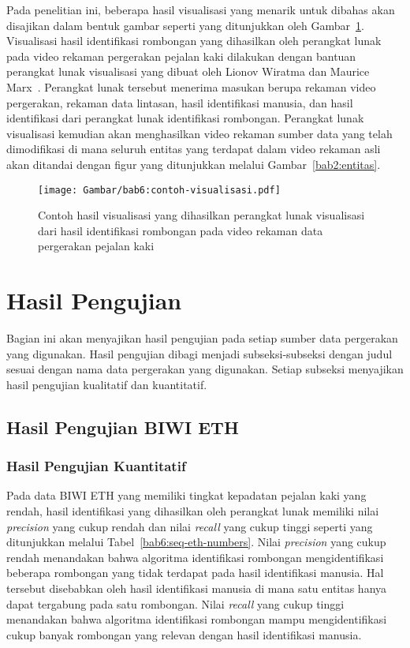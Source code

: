 Pada penelitian ini, beberapa hasil visualisasi yang menarik untuk dibahas akan disajikan dalam bentuk gambar seperti yang ditunjukkan oleh Gambar~\ref{bab6:contoh-visualisasi}. Visualisasi hasil identifikasi rombongan yang dihasilkan oleh perangkat lunak pada video rekaman pergerakan pejalan kaki dilakukan dengan bantuan perangkat lunak visualisasi yang dibuat oleh Lionov Wiratma dan Maurice Marx~\cite{wiratma:software}. Perangkat lunak tersebut menerima masukan berupa rekaman video pergerakan, rekaman data lintasan, hasil identifikasi manusia, dan hasil identifikasi dari perangkat lunak identifikasi rombongan. Perangkat lunak visualisasi kemudian akan menghasilkan video rekaman sumber data yang telah dimodifikasi di mana seluruh entitas yang terdapat dalam video rekaman asli akan ditandai dengan figur yang ditunjukkan melalui Gambar~\ref{bab2:entitas}.

\begin{figure}[h!]
    \centering
    \captionsetup{width=0.85\textwidth}
    \texttt{[image: Gambar/bab6:contoh-visualisasi.pdf]}
    \caption[Contoh hasil visualisasi rombongan]{Contoh hasil visualisasi yang dihasilkan perangkat lunak visualisasi dari hasil identifikasi rombongan pada video rekaman data pergerakan pejalan kaki}
    \label{bab6:contoh-visualisasi}
\end{figure}

\section{Hasil Pengujian}
\label{sec:result}

Bagian ini akan menyajikan hasil pengujian pada setiap sumber data pergerakan yang digunakan. Hasil pengujian dibagi menjadi subseksi-subseksi dengan judul sesuai dengan nama data pergerakan yang digunakan. Setiap subseksi menyajikan hasil pengujian kualitatif dan kuantitatif.

\subsection{Hasil Pengujian BIWI ETH}
\label{subsec:eth-result}

\subsubsection{Hasil Pengujian Kuantitatif}
\label{subsubsec:eth-quantitative}

Pada data BIWI ETH yang memiliki tingkat kepadatan pejalan kaki yang rendah, hasil identifikasi yang dihasilkan oleh perangkat lunak memiliki nilai \textit{precision} yang cukup rendah dan nilai \textit{recall} yang cukup tinggi seperti yang ditunjukkan melalui Tabel~\ref{bab6:seq-eth-numbers}. Nilai \textit{precision} yang cukup rendah menandakan bahwa algoritma identifikasi rombongan mengidentifikasi beberapa rombongan yang tidak terdapat pada hasil identifikasi manusia. Hal tersebut disebabkan oleh hasil identifikasi manusia di mana satu entitas hanya dapat tergabung pada satu rombongan. Nilai \textit{recall} yang cukup tinggi menandakan bahwa algoritma identifikasi rombongan mampu
mengidentifikasi cukup banyak rombongan yang relevan dengan hasil identifikasi manusia.

